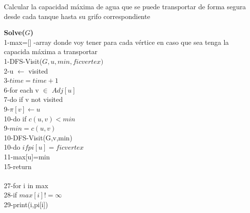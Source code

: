 \documentclass{article}
\begin{document}
    \begin{algorithm}
        \caption{Calcular la capacidad máxima de agua que se puede transportar de forma segura desde cada tanque hasta su grifo correspondiente}
        \textbf{Solve($G$)\\}
        1-\hspace*{1em}max=[] -array donde voy tener para cada v\'ertice en caso que sea tenga la capacida m\'axima a transportar\\
        1-\hspace*{1em}DFS-Visit($G,u,min,ficvertex)$\\ 
        2-\hspace*{2em}u $\leftarrow$ visited \\
        3-\hspace*{2em}$time=time+1$ \\  
        6-\hspace*{2em}for each v $\in$ $Adj[u]$\\
        7-\hspace*{3em}do if v not visited\\
        9-\hspace*{4em}$\pi[v] \leftarrow u$\\
        10-\hspace*{4em}do if $c(u,v)< min$\\
        9-\hspace*{4em}$min=c(u,v)$\\
        10-\hspace*{4em}DFS-Visit(G,v,min)\\
        10-\hspace*{2em}do $if pi[u]=ficvertex$\\
        11-\hspace*{3em}max[u]=min\\        
        15-\hspace*{2em}return\\\\
        27-\hspace*{1em}for i in max\\
        28-\hspace*{2em}if $max[i] != \infty $\\
        29-\hspace*{3em}print(i,pi[i])\\
        
        
    \end{algorithm}
\end{document}
